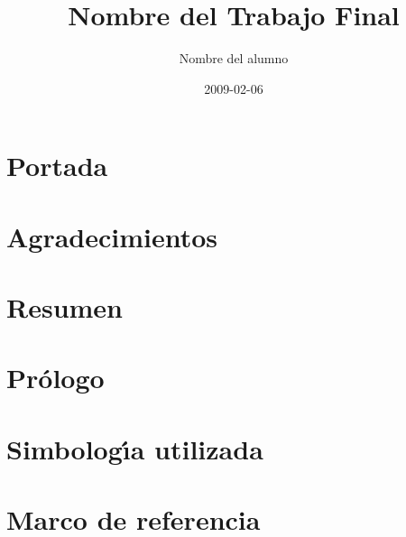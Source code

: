 \documentclass[letterpaper,10pt,graphicx,caption,rotating,oneside]{book}
\author{Nombre del alumno}
\title{Nombre del Trabajo Final}
\date{2009-02-06}
\begin{document}

\maketitle



\setcounter{page}{2}

\chapter*{Portada} 			


\chapter*{Agradecimientos}		


\chapter*{Resumen} 			


\chapter*{Pr\'{o}logo} 			

\chapter*{Simbolog\'{\i}a utilizada}	


\tableofcontents			%
\listoffigures				%
\listoftables

\renewcommand{\indexname}{\'{I}ndice alfabético}	%
\renewcommand{\listtablename}{\'{I}ndice de tablas}	%
\renewcommand{\tablename}{Tabla}

\chapter{Marco de referencia}







\end{document}
